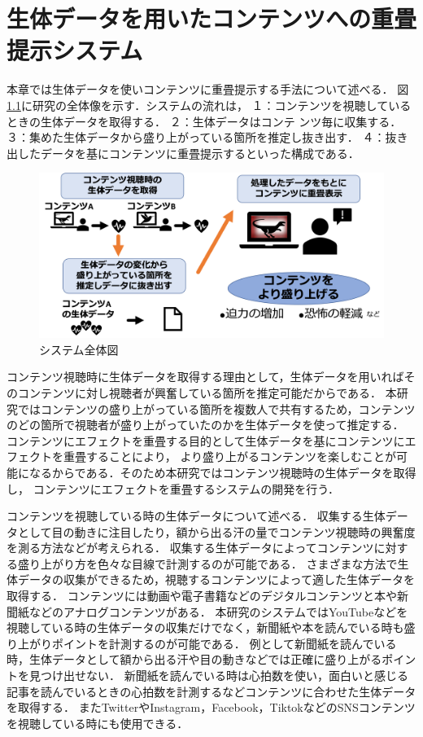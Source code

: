 \chapter{生体データを用いたコンテンツへの重畳提示システム}

\thispagestyle{myheadings}

本章では生体データを使いコンテンツに重畳提示する手法について述べる．
図\ref{systemall}に研究の全体像を示す．システムの流れは，
１：コンテンツを視聴しているときの生体データを取得する．
２：生体データはコンテ ンツ毎に収集する．
３：集めた生体データから盛り上がっている箇所を推定し抜き出す．
４：抜き出したデータを基にコンテンツに重畳提示するといった構成である．

\begin{figure}[H]
    \centering
    \includegraphics[width=15cm]{images/chapter3/allsysytem.png}
    \caption{システム全体図}
    \label{systemall}
\end{figure}



コンテンツ視聴時に生体データを取得する理由として，生体データを用いればそのコンテンツに対し視聴者が興奮している箇所を推定可能だからである．
本研究ではコンテンツの盛り上がっている箇所を複数人で共有するため，コンテンツのどの箇所で視聴者が盛り上がっていたのかを生体データを使って推定する．
コンテンツにエフェクトを重畳する目的として生体データを基にコンテンツにエフェクトを重畳することにより，
より盛り上がるコンテンツを楽しむことが可能になるからである．そのため本研究ではコンテンツ視聴時の生体データを取得し，
コンテンツにエフェクトを重畳するシステムの開発を行う．

コンテンツを視聴している時の生体データについて述べる．
収集する生体データとして目の動きに注目したり，額から出る汗の量でコンテンツ視聴時の興奮度を測る方法などが考えられる．
収集する生体データによってコンテンツに対する盛り上がり方を色々な目線で計測するのが可能である．
さまざまな方法で生体データの収集ができるため，視聴するコンテンツによって適した生体データを取得する．
コンテンツには動画や電子書籍などのデジタルコンテンツと本や新聞紙などのアナログコンテンツがある．
本研究のシステムではYouTubeなどを視聴している時の生体データの収集だけでなく，新聞紙や本を読んでいる時も盛り上がりポイントを計測するのが可能である．
例として新聞紙を読んでいる時，生体データとして額から出る汗や目の動きなどでは正確に盛り上がるポイントを見つけ出せない．
新聞紙を読んでいる時は心拍数を使い，面白いと感じる記事を読んでいるときの心拍数を計測するなどコンテンツに合わせた生体データを取得する．
またTwitterやInstagram，Facebook，TiktokなどのSNSコンテンツを視聴している時にも使用できる．


